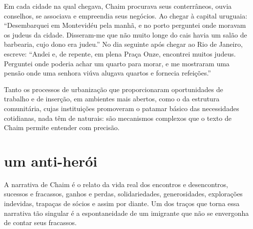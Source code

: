 Em cada cidade na qual chegava, Chaim procurava seus conterrâneos, ouvia
conselhos, se associava e empreendia seus negócios. Ao chegar à capital
uruguaia: ``Desembarquei em Montevidéu pela manhã, e no porto perguntei 
onde moravam os judeus da cidade. Disseram-me que não muito
longe do cais havia um salão de barbearia, cujo dono era judeu.'' No dia
seguinte após chegar ao Rio de Janeiro, escreve: ``Andei
e, de repente, em plena Praça Onze, encontrei muitos judeus.
Perguntei onde poderia achar um quarto para morar, e me
mostraram uma pensão onde uma senhora viúva alugava quartos e fornecia
refeições.'' 


Tanto os processos de urbanização que proporcionaram oportunidades de
trabalho e de inserção, em ambientes mais abertos, como o da estrutura
comunitária, cujas instituições promoveram o patamar básico das
necessidades cotidianas, nada têm de naturais: são mecanismos complexos
que o texto de Chaim permite entender com precisão.

\section{um anti-herói}

A narrativa de Chaim é o relato da vida real dos encontros e
desencontros, sucessos e fracassos, ganhos e perdas, solidariedades,
generosidades, explorações indevidas, trapaças de sócios e assim por
diante. Um dos traços que torna essa narrativa tão singular é a
espontaneidade de um imigrante que não se envergonha de contar seus
fracassos.



